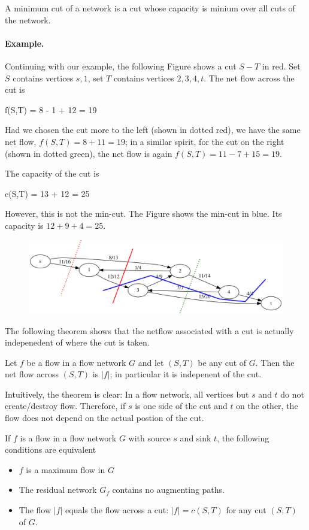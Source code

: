 A minimum cut of a network is a cut whose capacity is minium over all cuts of the network.

\paragraph{Example.} Continuing with our example, the following Figure shows a cut $S-T$ in red. Set $S$ contains vertices $s,1$, set $T$ contains vertices $2,3,4,t$. The net flow across the cut is

\bee
f(S,T) = 8 - 1 + 12 = 19 
\eee

Had we chosen the cut more to the left (shown in dotted red), we have the same net flow, $f(S,T) = 8 + 11 = 19$; in a similar spirit, for the cut on the right (shown in dotted green), the net flow is again $f(S,T) = 11 - 7 + 15 = 19$.

The capacity of the cut is

\bee
c(S,T) = 13 + 12 = 25
\eee

However, this is not the min-cut. The Figure shows the min-cut in blue. Its capacity is $12 + 9 + 4 = 25$.


\begin{figure}[H] \centering
\includegraphics[scale=0.6]{images/max_flow_03.png}
\end{figure}


The following theorem shows that the netflow associated with a cut is actually indepenedent of where the cut is taken.

\begin{theorem}
  Let $f$ be a flow in a flow network $G$ and let $(S,T)$ be any cut of $G$. Then the net flow across $(S,T)$ is $|f|$; in particular it is indepenent of the cut.
\end{theorem}

Intuitively, the theorem is clear: In a flow network, all vertices but $s$ and $t$ do not create/destroy flow. Therefore, if $s$ is one side of the cut and $t$ on the other, the flow does not depend on the actual postion of the cut. 


\begin{theorem}
  If $f$ is a flow in a flow network $G$ with source $s$ and sink $t$, the following conditions are equivalent
  \begin{itemize}
  \item $f$ is a maximum flow in $G$
  \item The residual network $G_f$ contains no augmenting paths.
  \item The flow $|f|$ equals the flow across a cut: $|f| = c(S,T)$ for any cut $(S,T)$ of $G$.
  \end{itemize}
\end{theorem}

